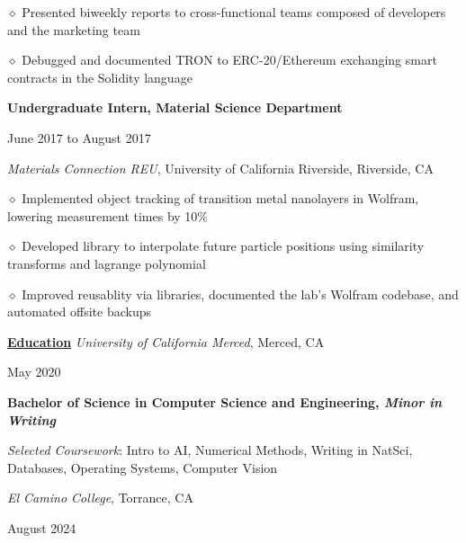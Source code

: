 \documentclass [11pt]{article}
\begin{document}
\begin{flushleft}
\quad\quad\quad$\diamond$ Presented biweekly reports to cross-functional teams composed of developers and the marketing team

‭‭\quad\quad\quad$\diamond$ Debugged and documented TRON to ERC-20/Ethereum exchanging smart contracts in the Solidity language

\linebreak
\textbf{Undergraduate Intern, Material Science Department}\begin{minipage}{0.535 \linewidth}\begin{flushright}June 2017 to August 2017\end{flushright}\end{minipage}
\emph{Materials Connection REU}, University of California Riverside, Riverside, CA

‭‭\quad\quad\quad$\diamond$ ‭Implemented object tracking of transition metal nanolayers in Wolfram, lowering measurement times by 10$\%$

‭‭\quad\quad\quad$\diamond$ Developed library to interpolate future particle positions using similarity transforms and lagrange polynomial

‭‭\quad\quad\quad$\diamond$ Improved reusablity via libraries, documented the lab’s Wolfram codebase, and automated offsite backups

\linebreak

\vspace{7}
\underline{\textbf{Education}}
\linebreak
\emph{University of California Merced}, Merced, CA\begin{minipage}{0.63 \linewidth}\begin{flushright}May 2020\end{flushright}\end{minipage}
\textbf{Bachelor of Science in Computer Science and Engineering, \emph{Minor in Writing}}

\raggedleft
\emph{Selected Coursework}: Intro to AI, Numerical Methods, Writing in NatSci, Databases, Operating Systems, Computer Vision
\normalsize
\linebreak
\raggedright
\emph{El Camino College}, Torrance, CA\begin{minipage}{0.725 \linewidth}\begin{flushright}August 2024\end{flushright}\end{minipage}


\end{flushleft}
\end{document}
